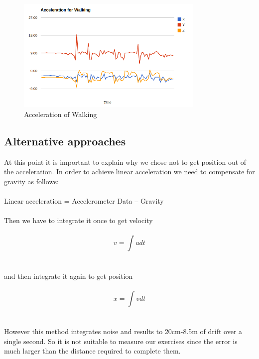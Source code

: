 \begin{figure}[H]
	\centering
		\includegraphics[width=0.80\textwidth]{images/Chart2.png}
	\caption{Acceleration of Walking}
	\label{fig:acceleration3}
\end{figure}


\subsection{Alternative approaches}

At this point it is important to explain why we chose not to get position out of the acceleration.
In order to achieve linear acceleration we need to compensate for gravity as follows:
\\\\
Linear acceleration = Accelerometer Data – Gravity
\\\\
Then we have to integrate it once to get velocity 
\\\\
$$v= \int a dt$$
\\\\
and then integrate it again to get position
\\\\
$$x= \int v dt$$
\\\\
However this method integrates noise and results to 20cm-8.5m of drift over a single second. So it is not suitable to measure our exercises since the error is much larger than the distance required to complete them.

